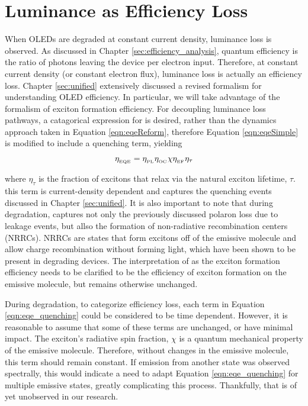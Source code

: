 \documentclass[../thesis.tex]{subfiles}
\begin{document}
\section{Luminance as Efficiency Loss}

When OLEDs are degraded at constant current density, luminance loss is observed.  
As discussed in Chapter \ref{sec:efficiency_analysis}, quantum efficiency is the ratio of photons leaving the device per electron input.
Therefore, at constant current density (or constant electron flux), luminance loss is actually an efficiency loss.
Chapter \ref{sec:unified} extensively discussed a revised formalism for understanding OLED efficiency.
In particular, we will take advantage of the formalism of exciton formation efficiency.  
For decoupling luminance loss pathways, a catagorical expression for \eqe is desired, rather than the dynamics approach taken in Equation \ref{eqn:eqeReform}, therefore Equation \ref{eqn:eqeSimple} is modified to include a quenching term, yielding

\begin{equation}
\eta_{_\text{\tiny EQE}}=\eta_{_\text{\tiny PL}}\eta_{_\text{\tiny OC}}\chi\eta_{_\text{\tiny EF}}\eta_\tau
\label{eqn:eqe_quenching}
\end{equation}

where $\eta_\tau$ is the fraction of excitons that relax via the natural exciton lifetime, $\tau$.  
this term is current-density dependent and captures the quenching events discussed in Chapter \ref{sec:unified}.
It is also important to note that during degradation, \ef captures not only the previously discussed polaron loss due to leakage events, but allso the formation of non-radiative recombination centers (NRRCs).
NRRCs are states that form excitons off of the emissive molecule and allow charge recombination without forming light, which have been shown to be present in degrading devices.\cite{Kondakov2003,Kondakov2007d}
The interpretation of \ef as the exciton formation efficiency needs to be clarified to be the efficiency of exciton formation on the emissive molecule, but remains otherwise unchanged.

During degradation, to categorize efficiency loss, each term in Equation \ref{eqn:eqe_quenching} could be considered to be time dependent.  
However, it is reasonable to assume that some of these terms are unchanged, or have minimal impact.
The exciton's radiative spin fraction, $\chi$ is a quantum mechanical property of the emissive molecule.
Therefore, without changes in the emissive molecule, this term should remain constant.  
If emission from another state was observed spectrally, this would indicate a need to adapt Equation \ref{eqn:eqe_quenching} for multiple emissive states, greatly complicating this process.
Thankfully, that is of yet unobserved in our research.
\end{document}
